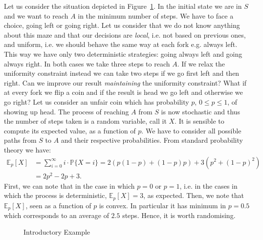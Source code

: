 \begin{example}
	Let us consider the situation depicted in Figure~\ref{figure:intro}. In the initial state we are in $S$ and we want to reach $A$ in the minimum number of steps. We have to face a choice, going left or going right. Let us consider that we do not know anything about this maze and that our decisions are \emph{local}, i.e. not based on previous ones, and uniform, i.e. we should behave the same way at each fork e.g. always left. This way we have only two deterministic strategies: going always left and going always right. In both cases we take three steps to reach $A$. If we relax the uniformity constraint instead we can take two steps if we go first left and then right. Can we improve our result \emph{maintaining} the uniformity constraint? What if at every fork we flip a coin and if the result is head we go left and otherwise we go right? Let us consider an unfair coin which has probability $p$, $0\leq p\leq 1$, of showing up head. The process of reaching $A$ from $S$ is now stochastic and thus the number of steps taken is a random variable, call it $X$. It is sensible to compute its expected value, as a function of $p$. We have to consider all possible paths from $S$ to $A$ and their respective probabilities. From standard probability theory we have:
	\begin{align*}
	\mathbb{E}_p[X]&=\sum\limits_{i=0}^{\infty} i\cdot\mathbb{P}\{X=i\}=2(p(1-p)+ (1-p)p)+3(p^2+(1-p)^2)\\
	&=2p^2-2p+3.
	\end{align*}
	First, we can note that in the case in which $p=0$ or $p=1$, i.e. in the cases in which the process is deterministic, $\mathbb{E}_p[X]=3$, as expected. Then, we note that $\mathbb{E}_p[X]$, seen as a function of $p$ is convex. In particular it has minimum in $p=0.5$ which corresponds to an average of $2.5$ steps. Hence, it is worth randomising.
\end{example}
\begin{figure}
	\caption{Introductory Example}
	\label{figure:intro}
\end{figure}
